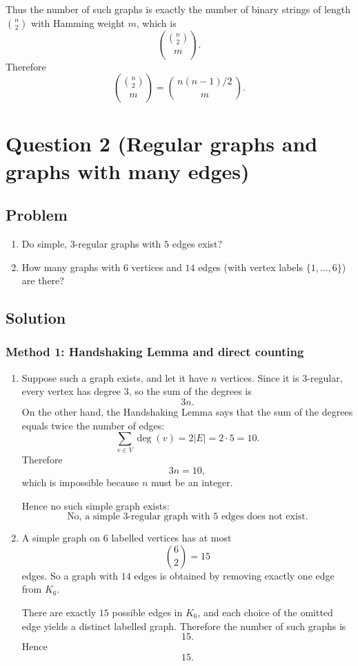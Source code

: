 \documentclass[12pt]{article}
\begin{document}
Thus the number of such graphs is exactly the number of binary strings of length \(\binom{n}{2}\) with Hamming weight \(m\), which is
\[
\binom{\binom{n}{2}}{m}.
\]
Therefore
\[
\boxed{\binom{\binom{n}{2}}{m}=\binom{\,n(n-1)/2\,}{m}.}
\]

\newpage

\section{Question 2 (Regular graphs and graphs with many edges)}

\subsection{Problem}
\begin{enumerate}[label=(\alph*)]
\item Do simple, \(3\)-regular graphs with \(5\) edges exist?
\item How many graphs with \(6\) vertices and \(14\) edges (with vertex labels \(\{1,\dots,6\}\)) are there?
\end{enumerate}

\subsection{Solution}

\subsubsection{Method 1: Handshaking Lemma and direct counting}
\begin{enumerate}[label=(\alph*)]
\item Suppose such a graph exists, and let it have \(n\) vertices. Since it is \(3\)-regular, every vertex has degree \(3\), so the sum of the degrees is
\[
3n.
\]
On the other hand, the Handshaking Lemma says that the sum of the degrees equals twice the number of edges:
\[
\sum_{v\in V}\deg(v)=2|E|=2\cdot 5=10.
\]
Therefore
\[
3n=10,
\]
which is impossible because \(n\) must be an integer.

Hence no such simple graph exists:
\[
\boxed{\text{No, a simple \(3\)-regular graph with \(5\) edges does not exist.}}
\]

\item A simple graph on \(6\) labelled vertices has at most
\[
\binom{6}{2}=15
\]
edges. So a graph with \(14\) edges is obtained by removing exactly one edge from \(K_6\).

There are exactly \(15\) possible edges in \(K_6\), and each choice of the omitted edge yields a distinct labelled graph. Therefore the number of such graphs is
\[
15.
\]
Hence
\[
\boxed{15.}
\]
\end{enumerate}
\end{document}
